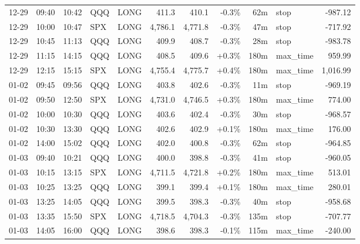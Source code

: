\documentclass[11pt,a4paper,twoside]{article}
\begin{document}
\begin{center}
\begin{longtable}{>{\color{txtmain}}l l l l l r r r r >{\color{txtmain}}l r}
12-29 & 09:40 & 10:42 & QQQ & LONG & 411.3 & 410.1 & \textcolor{lossred}{-0.3\%} & 62m & stop & \textcolor{lossred}{-987.12} \\
12-29 & 10:00 & 10:47 & SPX & LONG & 4,786.1 & 4,771.8 & \textcolor{lossred}{-0.3\%} & 47m & stop & \textcolor{lossred}{-717.92} \\
12-29 & 10:45 & 11:13 & QQQ & LONG & 409.9 & 408.7 & \textcolor{lossred}{-0.3\%} & 28m & stop & \textcolor{lossred}{-983.78} \\
12-29 & 11:15 & 14:15 & QQQ & LONG & 408.5 & 409.6 & \textcolor{wingreen}{+0.3\%} & 180m & max\_time & \textcolor{wingreen}{959.99} \\
12-29 & 12:15 & 15:15 & SPX & LONG & 4,755.4 & 4,775.7 & \textcolor{wingreen}{+0.4\%} & 180m & max\_time & \textcolor{wingreen}{1,016.99} \\
01-02 & 09:45 & 09:56 & QQQ & LONG & 403.8 & 402.6 & \textcolor{lossred}{-0.3\%} & 11m & stop & \textcolor{lossred}{-969.19} \\
01-02 & 09:50 & 12:50 & SPX & LONG & 4,731.0 & 4,746.5 & \textcolor{wingreen}{+0.3\%} & 180m & max\_time & \textcolor{wingreen}{774.00} \\
01-02 & 10:00 & 10:30 & QQQ & LONG & 403.6 & 402.4 & \textcolor{lossred}{-0.3\%} & 30m & stop & \textcolor{lossred}{-968.57} \\
01-02 & 10:30 & 13:30 & QQQ & LONG & 402.6 & 402.9 & \textcolor{wingreen}{+0.1\%} & 180m & max\_time & \textcolor{wingreen}{176.00} \\
01-02 & 14:00 & 15:02 & QQQ & LONG & 402.0 & 400.8 & \textcolor{lossred}{-0.3\%} & 62m & stop & \textcolor{lossred}{-964.85} \\
01-03 & 09:40 & 10:21 & QQQ & LONG & 400.0 & 398.8 & \textcolor{lossred}{-0.3\%} & 41m & stop & \textcolor{lossred}{-960.05} \\
01-03 & 10:15 & 13:15 & SPX & LONG & 4,711.5 & 4,721.8 & \textcolor{wingreen}{+0.2\%} & 180m & max\_time & \textcolor{wingreen}{513.01} \\
01-03 & 10:25 & 13:25 & QQQ & LONG & 399.1 & 399.4 & \textcolor{wingreen}{+0.1\%} & 180m & max\_time & \textcolor{wingreen}{280.01} \\
01-03 & 13:25 & 14:05 & QQQ & LONG & 399.5 & 398.3 & \textcolor{lossred}{-0.3\%} & 40m & stop & \textcolor{lossred}{-958.68} \\
01-03 & 13:35 & 15:50 & SPX & LONG & 4,718.5 & 4,704.3 & \textcolor{lossred}{-0.3\%} & 135m & stop & \textcolor{lossred}{-707.77} \\
01-03 & 14:05 & 16:00 & QQQ & LONG & 398.6 & 398.3 & \textcolor{lossred}{-0.1\%} & 115m & max\_time & \textcolor{lossred}{-240.00} \\

\end{longtable}
\end{center}
\end{document}
